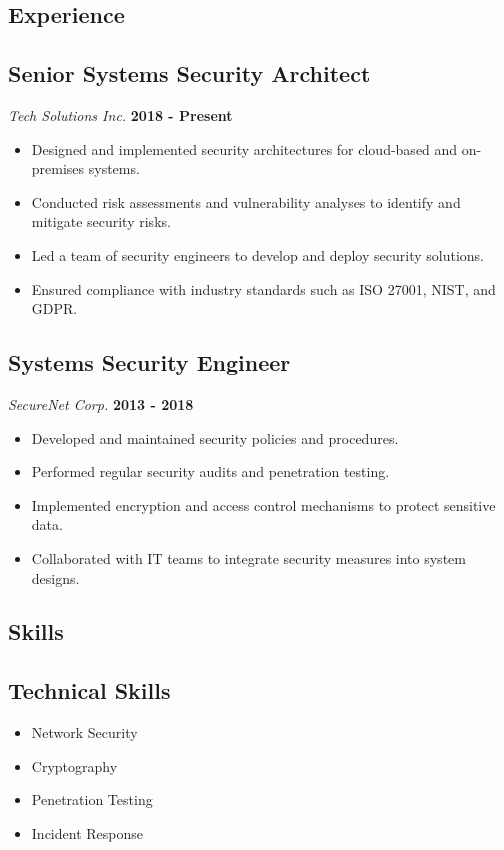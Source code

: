 \documentclass[letter,10pt]{article}
\begin{document}
\begin{paracol}{2}
\begin{leftcolumn}
\section*{Experience}

\subsection*{Senior Systems Security Architect}
\textit{Tech Solutions Inc.} \hfill \textbf{2018 - Present}
\begin{itemize}[leftmargin=0.15in]
    \item Designed and implemented security architectures for cloud-based and on-premises systems.
    \item Conducted risk assessments and vulnerability analyses to identify and mitigate security risks.
    \item Led a team of security engineers to develop and deploy security solutions.
    \item Ensured compliance with industry standards such as ISO 27001, NIST, and GDPR.
\end{itemize}

\subsection*{Systems Security Engineer}
\textit{SecureNet Corp.} \hfill \textbf{2013 - 2018}
\begin{itemize}[leftmargin=0.15in]
    \item Developed and maintained security policies and procedures.
    \item Performed regular security audits and penetration testing.
    \item Implemented encryption and access control mechanisms to protect sensitive data.
    \item Collaborated with IT teams to integrate security measures into system designs.
\end{itemize}


\end{leftcolumn}
\begin{rightcolumn}

\section*{Skills}
\subsection*{Technical Skills}
\begin{itemize}
    \item Network Security
    \item Cryptography
    \item Penetration Testing
    \item Incident Response
\end{itemize}


\end{rightcolumn}
\end{paracol}
\end{document}
